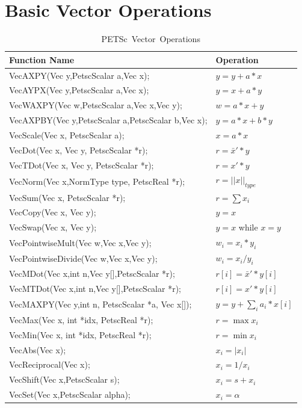 \section{Basic Vector Operations}  
\label{sec_vecbasic}
\begin{table}[tb]
\begin{center}
\begin{tabular}{ll}
{\bf Function Name} & {\bf Operation} \\
\hline
VecAXPY(Vec y,PetscScalar a,Vec x); & $ y = y + a*x$ \\
VecAYPX(Vec y,PetscScalar a,Vec x); & $ y = x + a*y$ \\
VecWAXPY(Vec w,PetscScalar a,Vec x,Vec y); & $ w = a*x + y$ \\
VecAXPBY(Vec y,PetscScalar a,PetscScalar b,Vec x); & $ y = a*x + b*y$ \\
VecScale(Vec x, PetscScalar a); & $ x = a*x $ \\
VecDot(Vec x, Vec y, PetscScalar *r); & $ r = \bar{x}'*y$ \\
VecTDot(Vec x, Vec y, PetscScalar *r); & $ r = x'*y$ \\
VecNorm(Vec x,NormType type,  PetscReal *r); & $ r = ||x||_{type}$ \\
VecSum(Vec x,   PetscScalar *r); & $ r = \sum x_{i}$ \\
VecCopy(Vec x, Vec y); & $ y = x $ \\
VecSwap(Vec x, Vec y); & $ y = x $ while $ x = y$ \\
VecPointwiseMult(Vec w,Vec x,Vec y); & $ w_{i} = x_{i}*y_{i} $ \\
VecPointwiseDivide(Vec w,Vec x,Vec y); & $ w_{i} = x_{i}/y_{i} $ \\
VecMDot(Vec x,int n,Vec y[],PetscScalar *r); & $ r[i] = \bar{x}'*y[i]$ \\
VecMTDot(Vec x,int n,Vec y[],PetscScalar *r); & $ r[i] = x'*y[i]$ \\
VecMAXPY(Vec y,int n, PetscScalar *a, Vec x[]); \hspace{1cm} & $ y = y + \sum_i a_{i}*x[i] $ \\
VecMax(Vec x,  int *idx, PetscReal *r); & $ r = \max x_{i}$ \\
VecMin(Vec x,  int *idx, PetscReal *r); & $ r = \min x_{i}$ \\
VecAbs(Vec x); & $ x_i = |x_{i}|$ \\
VecReciprocal(Vec x); & $ x_i = 1/x_{i}$ \\
VecShift(Vec x,PetscScalar s); & $ x_i = s + x_{i}$ \\
VecSet(Vec x,PetscScalar alpha); & $ x_i = \alpha$ \\
\hline 
\end{tabular}
\end{center}
\caption{\hbox{PETSc Vector Operations}}
\label{fig_vectorops}
\end{table}

